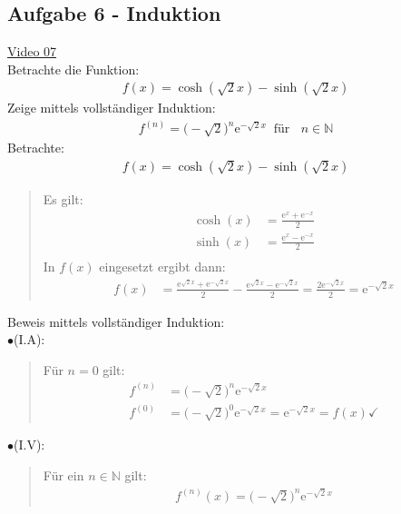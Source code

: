 \subsection{Aufgabe 6 - Induktion}
\href{https://youtu.be/LnNUw7oT4O4}{Video 07}\\
Betrachte die Funktion: \\
\begin{align*}
f(x) =\cosh(\sqrt{2}x)-\sinh(\sqrt{2}x)
\end{align*}
Zeige mittels vollständiger Induktion:\\
\begin{align*}
f^{(n)}=\big(-\sqrt{2}\big)^n\mathrm{e}^{-\sqrt{2}x}\;\;\text{für }\;\;n\in\mathbb{N}
\end{align*}
Betrachte:\\
\begin{align*}
f(x) =\cosh(\sqrt{2}x)-\sinh(\sqrt{2}x)
\end{align*}
\begin{quote}
	Es gilt:\\
	\begin{align*}
	\cosh(x)&=\frac{\mathrm{e}^x+\mathrm{e}^{-x}}{2}\\
	\sinh(x)&=\frac{\mathrm{e}^x-\mathrm{e}^{-x}}{2}\\
	\end{align*}
	In $ f(x) $ eingesetzt ergibt dann:\\
	\begin{align*}
	f(x)&=\frac{\mathrm{e}^{\sqrt{2}x}+\mathrm{e}^{-\sqrt{2}x}}{2}-\frac{\mathrm{e}^{\sqrt{2}x}-\mathrm{e}^{-\sqrt{2}x}}{2}=\frac{2\mathrm{e}^{-\sqrt{2}x}}{2}	=\mathrm{e}^{-\sqrt{2}x}
	\end{align*}
	
\end{quote}
Beweis  mittels vollständiger Induktion:\\
$ \bullet $\;\;(I.A):\\
\begin{quote}
	Für $ n=0 $ gilt:\\
	\begin{align*}
	f^{(n)}&=\big(-\sqrt{2}\big)^n\mathrm{e}^{-\sqrt{2}x}\\
	f^{(0)}&=\big(-\sqrt{2}\big)^0\mathrm{e}^{-\sqrt{2}x}=\mathrm{e}^{-\sqrt{2}x}=f(x)\checkmark
	\end{align*}
\end{quote}
$ \bullet $\;\;(I.V):\\
\begin{quote}
	Für ein $ n\in\mathbb{N} $ gilt:\\
	\begin{align*}
	f^{(n)}(x)=\big(-\sqrt{2}\big)^n\mathrm{e}^{-\sqrt{2}x}
	\end{align*}
\end{quote}
